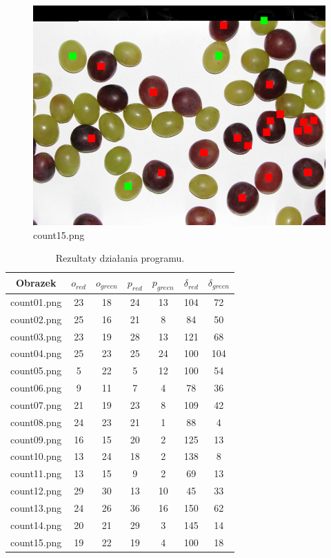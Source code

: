 \documentclass{classrep}
\begin{document}
\begin{figure}
\begin{minipage}{0.3\linewidth}
    \includegraphics[width=\textwidth]{gfx/count15_overlayed.png}
    \caption{count15.png}
    \label{fig:c15}
  \end{minipage}
\end{figure}

\begin{table}
\centering
\caption{Rezultaty działania programu.}
\label{tab:results}
\begin{tabular}{|c|c|c|c|c|c|c|}
\hline
Obrazek & $o_{red}$ & $o_{green}$ & $p_{red}$ & $p_{green}$ & $\delta_{red}$ & $\delta_{green}$ \\
\hline
\hline
count01.png & 23 & 18 & 24 & 13 & 104 & 72\\
\hline
count02.png & 25 & 16 & 21 & 8 & 84 & 50\\
\hline
count03.png & 23 & 19 & 28 & 13 & 121 & 68\\
\hline
count04.png & 25 & 23 & 25 & 24 & 100 & 104\\
\hline
count05.png & 5 & 22 & 5 & 12 & 100 & 54\\
\hline
count06.png & 9 & 11 & 7 & 4 & 78 & 36\\
\hline
count07.png & 21 & 19 & 23 & 8 & 109 & 42\\
\hline
count08.png & 24 & 23 & 21 & 1 & 88 & 4\\
\hline
count09.png & 16 & 15 & 20 & 2 & 125 & 13\\
\hline
count10.png & 13 & 24 & 18 & 2 & 138 & 8\\
\hline
count11.png & 13 & 15 & 9 & 2 & 69 & 13\\
\hline
count12.png & 29 & 30 & 13 & 10 & 45 & 33\\
\hline
count13.png & 24 & 26 & 36 & 16 & 150 & 62\\
\hline
count14.png & 20 & 21 & 29 & 3 & 145 & 14\\
\hline
count15.png & 19 & 22 & 19 & 4 & 100 & 18\\
\hline
\end{tabular}
\end{table}
\end{document}
